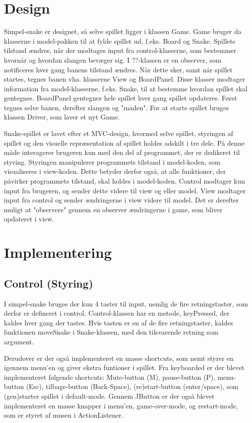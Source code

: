\documentclass{report}
\begin{document}
\section{Design}
Simpel-snake er designet, så selve spillet ligger i klassen Game. Game bruger da klasserne i model-pakken til at fylde spillet ud, f.eks. Board og Snake. Spillets tilstand ændres, når der modtages input fra control-klasserne, som bestemmer hvornår og hvordan slangen bevæger sig. I ??-klassen er en observer, som notificeres hver gang banens tilstand ændres. Når dette sker, samt når spillet startes, tegnes banen vha. klasserne View og BoardPanel. Disse klasser modtager information fra model-klasserne, f.eks. Snake, til at bestemme hvordan spillet skal gentegnes. BoardPanel gentegner hele spillet hver gang spillet opdateres. Først tegnes selve banen, derefter slangen og "maden". 
For at starte spillet bruges klassen Driver, som laver et nyt Game.
\linebreak

Snake-spillet er lavet efter et MVC-design, hvormed selve spillet, styringen af spillet og den visuelle repræsentation af spillet holdes adskilt i tre dele. På denne måde interagerer brugeren kun med den del af programmet, der er dedikeret til styring. Styringen manipulerer programmets tilstand i model-koden, som visualiseres i view-koden. Dette betyder derfor også, at alle funktioner, der påvirker programmets tilstand, skal holdes i model-koden. Control modtager kun input fra brugeren, og sender dette videre til view og eller model. View modtager input fra control og sender ændringerne i view videre til model. Det er derefter muligt at "observere" gennem en observer ændringerne i game, som bliver opdateret i view. 

\section{Implementering}


\subsection{Control (Styring)}
I simpel-snake bruges der kun 4 taster til input, nemlig de fire retningstaster, som derfor er defineret i control. Control-klassen har en metode, keyPressed, der kaldes hver gang der tastes. Hvis tasten er en af de fire retningstaster, kaldes funktionen moveSnake i Snake-klassen, med den tilsvarende retning som argument.

Derudover er der også implementeret en masse shortcuts, som nemt styrer en igennem menu'en og giver ekstra funtioner i spillet. Fra keyboarded er der blevet implementeret følgende shortcuts: Mute-button (M), pause-button (P), menu-button (Esc), tilbage-button (Back-Space), (re)start-button (enter/space), som (gen)starter spillet i default-mode.
Gennem JButton er der også blevet implementeret en masse knapper i menu'en, game-over-mode, og restart-mode, som er styret af musen i ActionListener.
\end{document}
